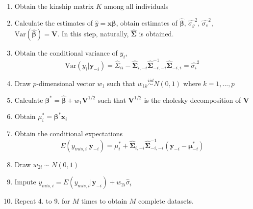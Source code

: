 \documentclass[preprint,12pt]{elsarticle}
\begin{document}
\begin{enumerate} 
    \item Obtain the kinship matrix $K$ among all individuals 
    \item Calculate the estimates of $\hat{y}=\mathbf{x}\boldsymbol{\beta}$, obtain estimates of $\hat{\boldsymbol{\beta}}$, $\hat{\sigma_g}^2$, $\hat{\sigma_e}^2$, $\text{Var}(\hat{\boldsymbol{\beta}})=\mathbf{V}$. In this step, naturally, $\boldsymbol{\hat{\Sigma}}$ is obtained.
    \item Obtain the conditional variance of $y_i$, 
    \begin{equation} 
        \text{Var}(y_i|\mathbf{y}_{-i})=\hat{\Sigma}_{ii}-\hat{\boldsymbol{\Sigma}}_{i,-i}\hat{\boldsymbol{\Sigma}}_{-i,-i}^{-1}\hat{\boldsymbol{\Sigma}}_{-i,i}=\hat{\sigma_i}^2
    \end{equation}
    \item Draw $p$-dimensional vector $w_1$ such that $w_{1k}\stackrel{iid}{\sim} N(0,1)$ where $k=1,...,p$
    \item Calculate $\boldsymbol{\beta}^*=\hat{\boldsymbol{\beta}}+w_1\mathbf{V}^{1/2}$ such that $\mathbf{V}^{1/2}$ is the cholesky decomposition of $\mathbf{V}$
    \item Obtain $\mu_i^*=\boldsymbol{\beta}^*\mathbf{x}_i$
    \item Obtain the conditional expectations 
    \begin{equation}
        E(y_{mis,i}|\mathbf{y}_{-i})=\mu_i^*+\hat{\boldsymbol{\Sigma}}_{i,-i}\hat{\boldsymbol{\Sigma}}_{-i,-i}^{-1}(\mathbf{y}_{-i}-\boldsymbol{\mu}^*_{-i})
    \end{equation}
    \item Draw $w_{2i}\sim N(0,1)$
    \item Impute $y_{mis,i}=E(y_{mis,i}|\mathbf{y}_{-i}) + w_{2i}\hat{\sigma}_i$
    \item Repeat 4. to 9. for $M$ times to obtain $M$ complete datasets.
\end{enumerate}
\end{document}
